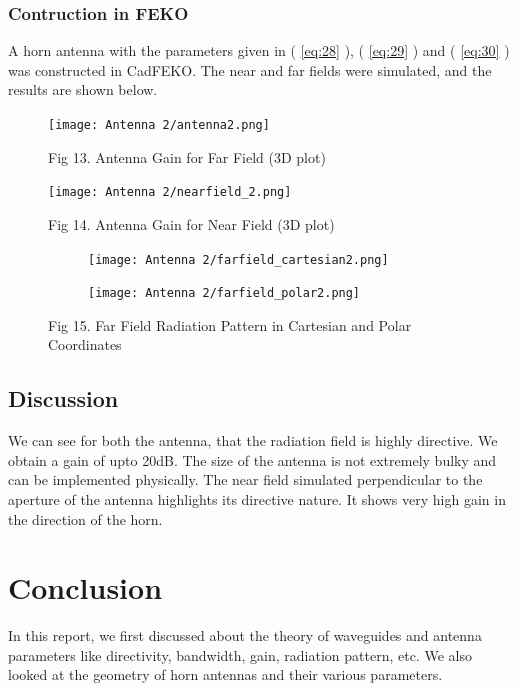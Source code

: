 \documentclass[12pt]{article}
\newcommand*{\myref}[1]{%
  \begingroup
    \hypersetup{
      linkcolor=linkequation,
      linkbordercolor=linkequation,
    }%
    \ref{#1}%
  \endgroup
}
\begin{document}
\subsubsection{Contruction in FEKO}
A horn antenna with the parameters given in (\myref{eq:28}), (\myref{eq:29}) and (\myref{eq:30}) was constructed in CadFEKO. The near and far fields were simulated, and the results are shown below. 
\begin{figure}[H]
  \centering
  \texttt{[image: Antenna 2/antenna2.png]}
  \caption{Fig 13. Antenna Gain for Far Field (3D plot)}
\end{figure}
\begin{figure}[H]
  \centering
  \texttt{[image: Antenna 2/nearfield\_2.png]}
  \caption{Fig 14. Antenna Gain for Near Field (3D plot)}
\end{figure}
\begin{figure} [H]
  \begin{subfigure}[b]{0.6\textwidth}
      \centering
      \texttt{[image: Antenna 2/farfield\_cartesian2.png]}
  \end{subfigure}%
  \begin{subfigure}[b]{0.65\textwidth}
      \centering
      \texttt{[image: Antenna 2/farfield\_polar2.png]}
  \end{subfigure}
  \caption{Fig 15. Far Field Radiation Pattern in Cartesian and Polar Coordinates}
\end{figure}
\subsection{Discussion}
We can see for both the antenna, that the radiation field is highly directive. We obtain a gain of upto 20dB. The size of the antenna is not extremely bulky and can be implemented physically. \linebreak
The near field simulated perpendicular to the aperture of the antenna highlights its directive nature. It shows very high gain in the direction of the horn.
\section{Conclusion}
In this report, we first discussed about the theory of waveguides and antenna parameters like directivity, bandwidth, gain, radiation pattern, etc. We also looked at the geometry of horn antennas and their various parameters. \linebreak
\end{document}

